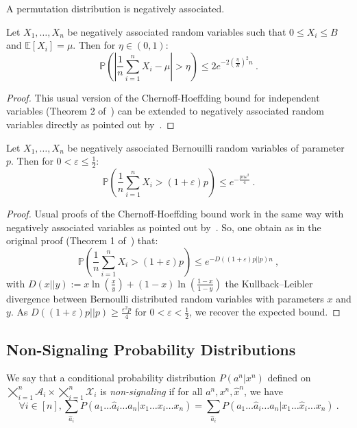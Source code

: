 \begin{proposition}
  \label{prop:permNA}
   A permutation distribution is negatively associated.
\end{proposition} 

\begin{proposition}
  \label{prop:chernoff1}
  Let $X_1, \ldots, X_n$ be negatively associated random variables such that $0 \leq X_i \leq B$ and $\mathbb{E}[X_i] = \mu$. Then for $\eta \in (0,1)$:
  \[ \mathbb{P}\left(\left|\frac{1}{n}\sum_{i=1}^n X_i - \mu\right| > \eta \right) \leq 2e^{-2\left(\frac{\eta}{B}\right)^2n} \ . \]
\end{proposition}
\begin{proof}
This usual version of the Chernoff-Hoeffding bound for independent variables (Theorem 2 of~\cite{Hoeffding63}) can be extended to negatively associated random variables directly as pointed out by~\cite{DR98}.
\end{proof}

\begin{proposition}
  \label{prop:chernoff2}
  Let $X_1, \ldots, X_n$ be negatively associated Bernouilli random variables of parameter $p$. Then for $0 < \varepsilon \leq \frac{1}{2}$:
  \[ \mathbb{P}\left(\frac{1}{n}\sum_{i=1}^n X_i > (1+\varepsilon)p \right) \leq e^{-\frac{pn\varepsilon^2}{4}} \ . \]
\end{proposition}
\begin{proof}
  Usual proofs of the Chernoff-Hoeffding bound work in the same way with negatively associated variables as pointed out by~\cite{DR98}. So, one obtain as in the original proof (Theorem 1 of~\cite{Hoeffding63}) that:
  \[ \mathbb{P}\left(\frac{1}{n}\sum_{i=1}^n X_i > (1+\varepsilon)p \right) \leq e^{-D\left((1+\varepsilon)p||p\right)n} \ ,\]
    with $D\left(x||y\right) := x\ln\left(\frac{x}{y}\right) + (1-x)\ln\left(\frac{1-x}{1-y}\right)$ the Kullback–Leibler divergence between Bernoulli distributed random variables with parameters $x$ and $y$. As $D\left((1+\varepsilon)p||p\right) \geq \frac{\varepsilon^2p}{4}$ for $0 < \varepsilon < \frac{1}{2}$, we recover the expected bound.
\end{proof}

\subsection{Non-Signaling Probability Distributions}
\begin{definition}
  \label{defi:nonsignaling}
  We say that a conditional probability distribution $P(a^n|x^n)$ defined on $\bigtimes_{i=1}^n\mathcal{A}_i \times \bigtimes_{i=1}^n \mathcal{X}_i$ is \emph{non-signaling} if for all $a^n, x^n, \hat{x}^n$, we have
    \[ \forall i \in [n], \sum_{\hat{a}_i}P(a_1\ldots \hat{a}_i \ldots a_n|x_1\ldots x_i \ldots x_n) = \sum_{\hat{a}_i}P(a_1\ldots \hat{a}_i \ldots a_n|x_1\ldots \hat{x}_i \ldots x_n) \ .\]
\end{definition}

